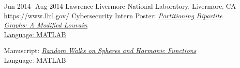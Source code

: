 \documentclass[10pt]{article} %
\begin{document}
\job
{Jun 2014 -}{Aug 2014}
{Lawrence Livermore National Laboratory, Livermore, CA}
{https://www.llnl.gov/}
{Cybersecurity Intern}
{
Poster: 
 \href{https://elischolar.library.yale.edu/dayofdata/2014/Posters/8/}{\textit{Partitioning Bipartite Graphs: A Modified Louvain}\\[2pt]
 Language: MATLAB}}

{Manuscript: \href{http://citeseerx.ist.psu.edu/viewdoc/summary?doi=10.1.1.673.1187}{\textit{Random Walks on Spheres and Harmonic Functions}}\\[2pt]
Language: MATLAB}






\end{document}
